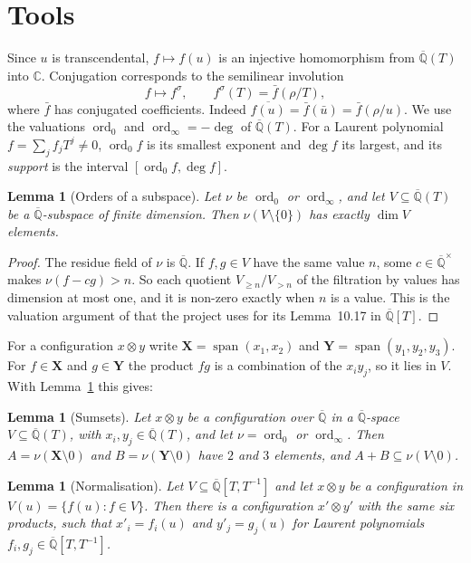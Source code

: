 \documentclass[11pt,a4paper]{article}
\theoremstyle{plain}
\newtheorem{lemma}[theorem]{Lemma}
\theoremstyle{definition}
\newcommand{\C}{\mathbb{C}}
\newcommand{\Qbar}{\overline{\mathbb{Q}}}
\newcommand{\ord}{\operatorname{ord}}
\newcommand{\spn}{\operatorname{span}}
\begin{document}
\section{Tools}\label{sec:tools}

Since $u$ is transcendental, $f\mapsto f(u)$ is an injective homomorphism from
$\Qbar(T)$ into $\C$. Conjugation corresponds to the semilinear involution
\[
  f\longmapsto f^{\sigma},\qquad f^{\sigma}(T)=\bar f(\rho/T),
\]
where $\bar f$ has conjugated coefficients. Indeed $\overline{f(u)}=\bar f(\bar u)=\bar f(\rho/u)$.
We use the valuations $\ord_{0}$ and $\ord_{\infty}=-\deg$ of $\Qbar(T)$. For a Laurent
polynomial $f=\sum_{j}f_{j}T^{j}\neq0$, $\ord_{0}f$ is its smallest exponent and $\deg f$ its
largest, and its \emph{support} is the interval $[\ord_{0}f,\deg f]$.

\begin{lemma}[Orders of a subspace]\label{lem:orders}
Let $\nu$ be $\ord_{0}$ or $\ord_{\infty}$, and let $V\subseteq\Qbar(T)$ be a $\Qbar$-subspace
of finite dimension. Then $\nu(V\setminus\{0\})$ has exactly $\dim V$ elements.
\end{lemma}

\begin{proof}
The residue field of $\nu$ is $\Qbar$. If $f,g\in V$ have the same value $n$, some
$c\in\Qbar^{\times}$ makes $\nu(f-cg)>n$. So each quotient $V_{\ge n}/V_{>n}$ of the
filtration by values has dimension at most one, and it is non-zero exactly when $n$
is a value. This is the valuation argument of \cite[\S7, proof of Th.~33]{BSZ17} that the project uses for
its Lemma~10.17 in $\Qbar[T]$.
\end{proof}

For a configuration $x\otimes y$ write $\mathbf X=\spn(x_{1},x_{2})$ and
$\mathbf Y=\spn(y_{1},y_{2},y_{3})$. For $f\in\mathbf X$ and $g\in\mathbf Y$ the product
$fg$ is a combination of the $x_{i}y_{j}$, so it lies in $V$. With
Lemma~\ref{lem:orders} this gives:

\begin{lemma}[Sumsets]\label{lem:sumset}
Let $x\otimes y$ be a configuration over $\Qbar$ in a $\Qbar$-space $V\subseteq\Qbar(T)$,
with $x_{i},y_{j}\in\Qbar(T)$, and let $\nu=\ord_{0}$ or $\ord_{\infty}$. Then $A=\nu(\mathbf X\setminus0)$ and
$B=\nu(\mathbf Y\setminus0)$ have $2$ and $3$ elements, and $A+B\subseteq\nu(V\setminus0)$.
\end{lemma}

\begin{lemma}[Normalisation]\label{lem:normal}
Let $V\subseteq\Qbar[T,T^{-1}]$ and let $x\otimes y$ be a configuration in
$V(u)=\{f(u):f\in V\}$. Then there is a configuration $x'\otimes y'$ with the same six
products, such that $x'_{i}=f_{i}(u)$ and $y'_{j}=g_{j}(u)$ for Laurent polynomials
$f_{i},g_{j}\in\Qbar[T,T^{-1}]$.
\end{lemma}
\end{document}
